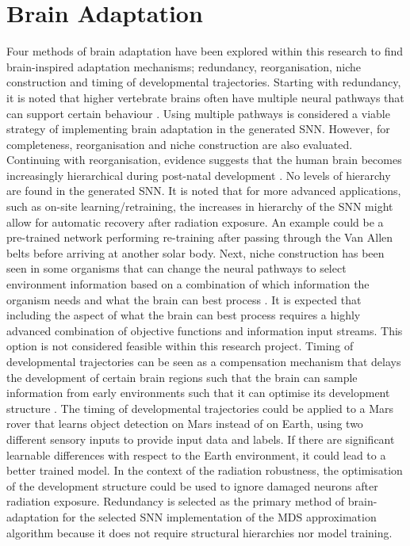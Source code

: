 \section{Brain Adaptation}\label{sec:brain_adaptation}
Four methods of brain adaptation have been explored within this research to find brain-inspired adaptation mechanisms; redundancy, reorganisation, niche construction and timing of developmental trajectories.  Starting with redundancy, it is noted that higher vertebrate brains often have multiple neural pathways that can support certain behaviour \cite{johnson_brain_2015}. Using multiple pathways is considered a viable strategy of implementing brain adaptation in the generated SNN. However, for completeness, reorganisation and niche construction are also evaluated. Continuing with reorganisation, evidence suggests that the human brain becomes increasingly hierarchical during post-natal development \cite{supekar_brain_2013}. No levels of hierarchy are found in the generated SNN. It is noted that for more advanced applications, such as on-site learning/retraining, the increases in hierarchy of the SNN might allow for automatic recovery after radiation exposure. An example could be a pre-trained network performing re-training after passing through the Van Allen belts before arriving at another solar body. Next, niche construction has been seen in some organisms that can change the neural pathways to select environment information based on a combination of which information the organism needs and what the brain can best process \cite{johnson_brain_2015}. It is expected that including the aspect of what the brain can best process requires a highly advanced combination of objective functions and information input streams. This option is not considered feasible within this research project. Timing of developmental trajectories can be seen as a compensation mechanism that delays the development of certain brain regions such that the brain can sample information from early environments such that it can optimise its development structure \cite{johnson_brain_2015}. The timing of developmental trajectories could be applied to a Mars rover that learns object detection on Mars instead of on Earth, using two different sensory inputs to provide input data and labels. If there are significant learnable differences with respect to the Earth environment, it could lead to a better trained model. In the context of the radiation robustness, the optimisation of the development structure could be used to ignore damaged neurons after radiation exposure. Redundancy is selected as the primary method of brain-adaptation for the selected SNN implementation of the MDS approximation algorithm because it does not require structural hierarchies nor model training.

